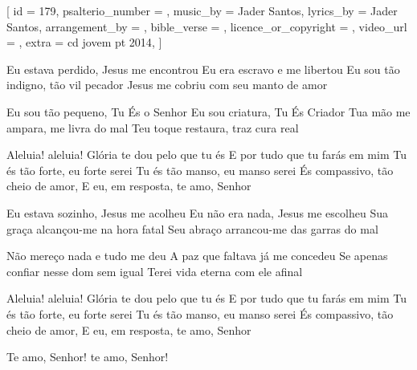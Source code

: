 [
    id                     = {179},
    psalterio_number       = {},
    music_by               = {Jader Santos},
    lyrics_by              = {Jader Santos},
    arrangement_by         = {},
    bible_verse            = {},
    licence_or_copyright   = {},
    video_url              = {},
    extra                  = {cd jovem pt 2014},
]

\beginverse
Eu estava perdido, Jesus me encontrou
Eu era escravo e me libertou
Eu sou tão indigno, tão vil pecador
Jesus me cobriu com seu manto de amor
\endverse

\beginverse
Eu sou tão pequeno, Tu És o Senhor
Eu sou criatura, Tu És Criador
Tua mão me ampara, me livra do mal
Teu toque restaura, traz cura real
\endverse

\beginchorus
Aleluia! aleluia!
Glória te dou pelo que tu és
E por tudo que tu farás em mim
Tu és tão forte, eu forte serei
Tu és tão manso, eu manso serei
És compassivo, tão cheio de amor,
E eu, em resposta, te amo, Senhor
\endchorus

\beginverse
Eu estava sozinho, Jesus me acolheu
Eu não era nada, Jesus me escolheu
Sua graça alcançou-me na hora fatal
Seu abraço arrancou-me das garras do mal
\endverse

\beginverse
Não mereço nada e tudo me deu
A paz que faltava já me concedeu
Se apenas confiar nesse dom sem igual
Terei vida eterna com ele afinal
\endverse

\beginchorus
Aleluia! aleluia!
Glória te dou pelo que tu és
E por tudo que tu farás em mim
Tu és tão forte, eu forte serei
Tu és tão manso, eu manso serei
És compassivo, tão cheio de amor,
E eu, em resposta, te amo, Senhor

Te amo, Senhor! te amo, Senhor!
\endchorus



\endsong
